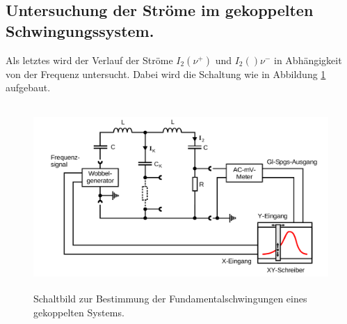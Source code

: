 \subsection{Untersuchung der Ströme im gekoppelten Schwingungssystem.} 
\label{sub:Untersuchung der Ströme im gekoppelten Schwingungssystem.}

Als letztes wird der Verlauf der Ströme $I_2(\nu^+)$ und $I_2()\nu^-$ in Abhängigkeit von der Frequenz untersucht.
Dabei wird die Schaltung wie in Abbildung \ref{fig:bild8} aufgebaut.

\begin{figure}

    \centering
    \includegraphics[height=7.0cm]{data/Bild8.png}
    \caption{Schaltbild zur Bestimmung der Fundamentalschwingungen eines gekoppelten Systems.}
    \label{fig:bild8}
\end{figure}





